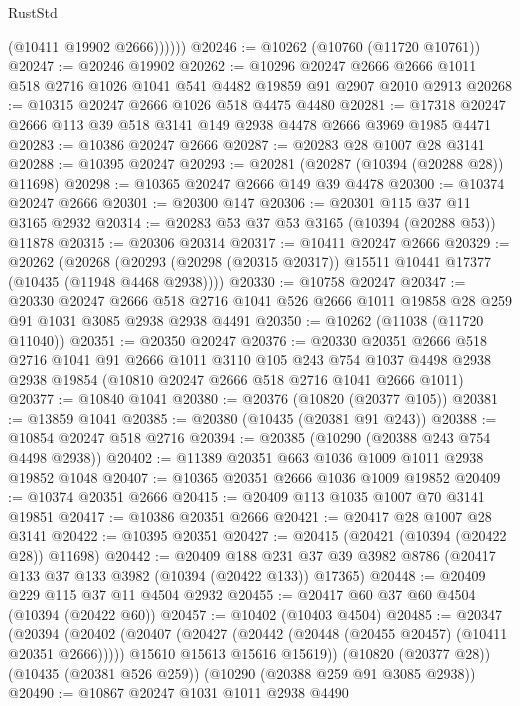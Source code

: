\begin{lexlean}{RustStd}
\begin{coremodule}
{\begin{coremodule}
{{{{{{{{{{{{{{{{{{{{{{{{{{{{{{{{{{{{{{{{{{{{{{{{{{{{{{{{{{{{{{{{{{{{{{{{{{{{{{              (@10411 @19902 @2666))))))
@20246 := @10262 (@10760 (@11720 @10761))
@20247 := @20246 @19902
@20262 := @10296
    @20247
    @2666
    @2666
    @1011
    @518
    @2716
    @1026
    @1041
    @541
    @4482
    @19859
    @91
    @2907
    @2010
    @2913
@20268 := @10315 @20247 @2666 @1026 @518 @4475 @4480
@20281 := @17318 @20247 @2666 @113 @39 @518 @3141 @149 @2938 @4478 @2666 @3969 @1985 @4471
@20283 := @10386 @20247 @2666
@20287 := @20283 @28 @1007 @28 @3141
@20288 := @10395 @20247
@20293 := @20281 (@20287 (@10394 (@20288 @28)) @11698)
@20298 := @10365 @20247 @2666 @149 @39 @4478
@20300 := @10374 @20247 @2666
@20301 := @20300 @147
@20306 := @20301 @115 @37 @11 @3165 @2932
@20314 := @20283 @53 @37 @53 @3165 (@10394 (@20288 @53)) @11878
@20315 := @20306 @20314
@20317 := @10411 @20247 @2666
@20329 := @20262
    (@20268 (@20293 (@20298 (@20315 @20317)) @15511 @10441 @17377 (@10435 (@11948 @4468 @2938))))
@20330 := @10758 @20247
@20347 := @20330
    @20247
    @2666
    @518
    @2716
    @1041
    @526
    @2666
    @1011
    @19858
    @28
    @259
    @91
    @1031
    @3085
    @2938
    @2938
    @4491
@20350 := @10262 (@11038 (@11720 @11040))
@20351 := @20350 @20247
@20376 := @20330
    @20351
    @2666
    @518
    @2716
    @1041
    @91
    @2666
    @1011
    @3110
    @105
    @243
    @754
    @1037
    @4498
    @2938
    @2938
    @19854
    (@10810 @20247 @2666 @518 @2716 @1041 @2666 @1011)
@20377 := @10840 @1041
@20380 := @20376 (@10820 (@20377 @105))
@20381 := @13859 @1041
@20385 := @20380 (@10435 (@20381 @91 @243))
@20388 := @10854 @20247 @518 @2716
@20394 := @20385 (@10290 (@20388 @243 @754 @4498 @2938))
@20402 := @11389 @20351 @663 @1036 @1009 @1011 @2938 @19852 @1048
@20407 := @10365 @20351 @2666 @1036 @1009 @19852
@20409 := @10374 @20351 @2666
@20415 := @20409 @113 @1035 @1007 @70 @3141 @19851
@20417 := @10386 @20351 @2666
@20421 := @20417 @28 @1007 @28 @3141
@20422 := @10395 @20351
@20427 := @20415 (@20421 (@10394 (@20422 @28)) @11698)
@20442 := @20409
    @188
    @231
    @37
    @39
    @3982
    @8786
    (@20417 @133 @37 @133 @3982 (@10394 (@20422 @133)) @17365)
@20448 := @20409 @229 @115 @37 @11 @4504 @2932
@20455 := @20417 @60 @37 @60 @4504 (@10394 (@20422 @60))
@20457 := @10402 (@10403 @4504)
@20485 := @20347
    (@20394
      (@20402
        (@20407 (@20427 (@20442 (@20448 (@20455 @20457) (@10411 @20351 @2666)))))
        @15610
        @15613
        @15616
        @15619))
    (@10820 (@20377 @28))
    (@10435 (@20381 @526 @259))
    (@10290 (@20388 @259 @91 @3085 @2938))
@20490 := @10867 @20247 @1031 @1011 @2938 @4490
}}}}}}}}}}}}}}}}}}}}}}}}}}}}}}}}}}}}}}}}}}}}}}}}}}}}}}}}}}}}}}}}}}}}}}}}}}}}}}
\end{coremodule}}
\end{coremodule}
\end{lexlean}
